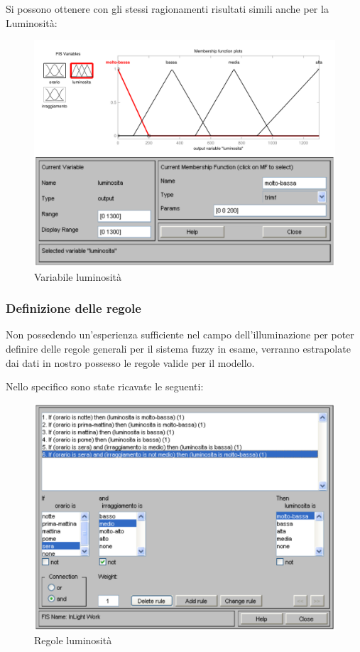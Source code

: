 Si possono ottenere con gli stessi ragionamenti risultati simili anche per la Luminosità:

\begin{figure}[htbp]
  \centering
  \includegraphics[scale=0.5]{images/fuzzy/variabile_luminosita.pdf}
  \caption{Variabile luminosità}
\end{figure}


\subsubsection{Definizione delle regole}
Non possedendo un'esperienza sufficiente nel campo dell'illuminazione per poter definire delle regole generali per il sistema fuzzy in esame, verranno estrapolate dai dati in nostro possesso le regole valide per il modello.

Nello specifico sono state ricavate le seguenti:

\begin{figure}[htbp]
  \centering
  \includegraphics[scale=0.5]{images/fuzzy/regole_luminosita.pdf}
  \caption{Regole luminosità}
\end{figure}

